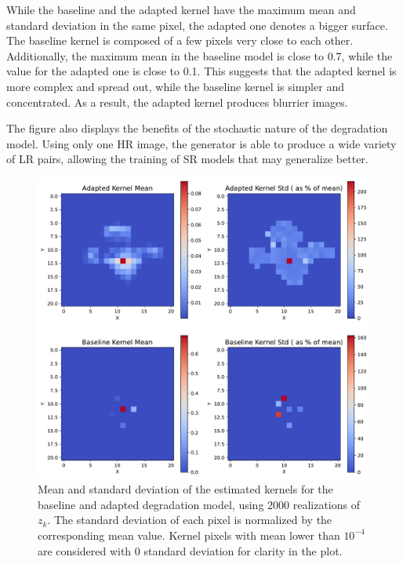         While the baseline and the adapted kernel have the maximum mean and standard deviation in the same pixel, the adapted one denotes a bigger surface.  
        The baseline kernel is composed of a few pixels very close to each other.
        Additionally, the maximum mean in the baseline model is close to 0.7, while the value for the adapted one is close to 0.1.
        This suggests that the adapted kernel is more complex and spread out, while the baseline kernel is simpler and concentrated.
        As a result, the adapted kernel produces blurrier images.
        
        The figure also displays the benefits of the stochastic nature of the degradation model.
        Using only one HR image, the generator is able to produce a wide variety of LR pairs, allowing the training of SR models that may generalize better.

        \begin{figure}[H]
            \centering
            \includegraphics[width=\textwidth]{Includes/5-source-kernel-mean-std.pdf}
            \caption{Mean and standard deviation of the estimated kernels for the baseline and adapted degradation model, using 2000 realizations of $z_k$.
                     The standard deviation of each pixel is normalized by the corresponding mean value. Kernel pixels with mean lower than $10^{-4}$ are considered with 0 standard deviation for clarity in the plot.}
            \label{fig:5-source-kernel-mean-std}
        \end{figure}

